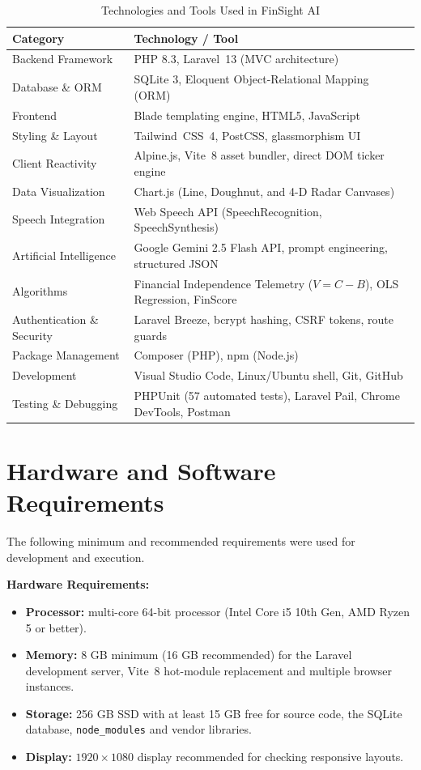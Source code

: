 \documentclass[12pt,a4paper]{report}
\newcommand{\LV}{Laravel~13}
\newcommand{\TW}{Tailwind~CSS~4}
\newcommand{\VITE}{Vite~8}
\begin{document}
\begin{table}[H]
\centering
\caption{Technologies and Tools Used in FinSight AI}
\renewcommand{\arraystretch}{1.3}
\begin{tabular}{|p{3.8cm}|p{10.3cm}|}
\hline
\textbf{Category} & \textbf{Technology / Tool} \\ \hline
Backend Framework & PHP 8.3, \LV{} (MVC architecture) \\ \hline
Database \& ORM & SQLite 3, Eloquent Object-Relational Mapping (ORM) \\ \hline
Frontend & Blade templating engine, HTML5, JavaScript \\ \hline
Styling \& Layout & \TW{}, PostCSS, glassmorphism UI \\ \hline
Client Reactivity & Alpine.js, \VITE{} asset bundler, direct DOM ticker engine \\ \hline
Data Visualization & Chart.js (Line, Doughnut, and 4-D Radar Canvases) \\ \hline
Speech Integration & Web Speech API (SpeechRecognition, SpeechSynthesis) \\ \hline
Artificial Intelligence & Google Gemini 2.5 Flash API, prompt engineering, structured JSON \\ \hline
Algorithms & Financial Independence Telemetry ($V=C-B$), OLS Regression, FinScore \\ \hline
Authentication \& Security & Laravel Breeze, bcrypt hashing, CSRF tokens, route guards \\ \hline
Package Management & Composer (PHP), npm (Node.js) \\ \hline
Development & Visual Studio Code, Linux/Ubuntu shell, Git, GitHub \\ \hline
Testing \& Debugging & PHPUnit (57 automated tests), Laravel Pail, Chrome DevTools, Postman \\ \hline
\end{tabular}
\end{table}


\section{Hardware and Software Requirements}\label{s33}

The following minimum and recommended requirements were used for development and execution.

\textbf{Hardware Requirements:}
\begin{itemize}[leftmargin=*]
    \item \textbf{Processor:} multi-core 64-bit processor (Intel Core i5 10th Gen, AMD Ryzen 5 or better).
    \item \textbf{Memory:} 8 GB minimum (16 GB recommended) for the Laravel development server, \VITE{} hot-module replacement and multiple browser instances.
    \item \textbf{Storage:} 256 GB SSD with at least 15 GB free for source code, the SQLite database, \texttt{node\_modules} and vendor libraries.
    \item \textbf{Display:} $1920 \times 1080$ display recommended for checking responsive layouts.
\end{itemize}
\end{document}
